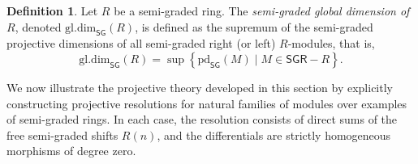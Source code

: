 \documentclass[reqno]{amsart}
\theoremstyle{definition}
\newtheorem{definition}[theorem]{Definition}
\theoremstyle{remark}
\numberwithin{equation}{section}
\begin{document}
\begin{definition}
Let $R$ be a semi-graded ring. The {\em semi-graded global dimension of} \(R\), denoted \(\mathrm{gl.dim}_{\mathsf{SG}}(R)\), is defined as the supremum of the semi-graded projective dimensions of all semi-graded right (or left) \(R\)-modules, that is, 
$$
\mathrm{gl.dim}_{\mathsf{SG}}(R) = \sup \left\{\mathrm{pd}_{\mathsf{SG}}(M)\mid M\in \mathsf{SGR}-R\right\}.
$$ 
\end{definition}


We now illustrate the projective theory developed in this section by explicitly constructing projective resolutions for natural families of modules over examples of semi-graded rings. In each case, the resolution consists of direct sums of the free semi-graded shifts $R(n)$, and the differentials are strictly homogeneous morphisms of degree zero.
\end{document}
